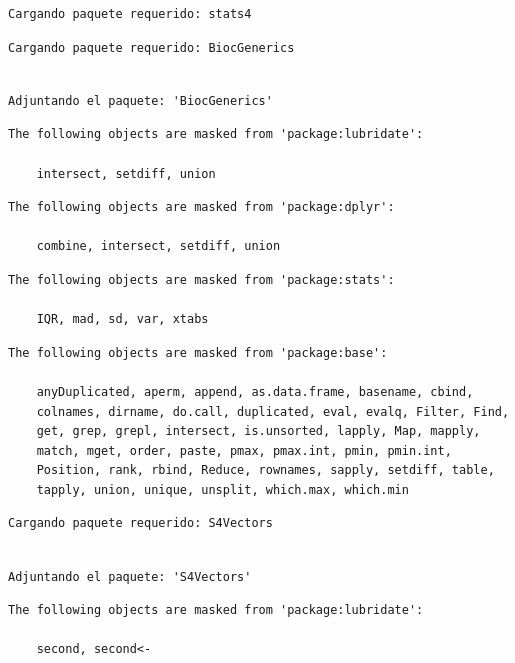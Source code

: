 \documentclass[
  letterpaper,
  DIV=11,
  numbers=noendperiod]{scrartcl}
\begin{document}
\begin{verbatim}
Cargando paquete requerido: stats4
\end{verbatim}

\begin{verbatim}
Cargando paquete requerido: BiocGenerics
\end{verbatim}

\begin{verbatim}

Adjuntando el paquete: 'BiocGenerics'
\end{verbatim}

\begin{verbatim}
The following objects are masked from 'package:lubridate':

    intersect, setdiff, union
\end{verbatim}

\begin{verbatim}
The following objects are masked from 'package:dplyr':

    combine, intersect, setdiff, union
\end{verbatim}

\begin{verbatim}
The following objects are masked from 'package:stats':

    IQR, mad, sd, var, xtabs
\end{verbatim}

\begin{verbatim}
The following objects are masked from 'package:base':

    anyDuplicated, aperm, append, as.data.frame, basename, cbind,
    colnames, dirname, do.call, duplicated, eval, evalq, Filter, Find,
    get, grep, grepl, intersect, is.unsorted, lapply, Map, mapply,
    match, mget, order, paste, pmax, pmax.int, pmin, pmin.int,
    Position, rank, rbind, Reduce, rownames, sapply, setdiff, table,
    tapply, union, unique, unsplit, which.max, which.min
\end{verbatim}

\begin{verbatim}
Cargando paquete requerido: S4Vectors
\end{verbatim}

\begin{verbatim}

Adjuntando el paquete: 'S4Vectors'
\end{verbatim}

\begin{verbatim}
The following objects are masked from 'package:lubridate':

    second, second<-
\end{verbatim}
\end{document}
